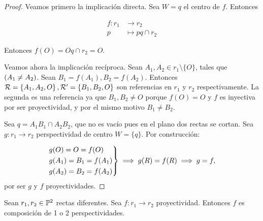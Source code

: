 \begin{proof}
    Veamos primero la implicación directa. Sea $W = {q}$
    el centro de $f$. Entonces

    \begin{align*}
    f : r_1 &\to r_2 \\
    p &\mapsto pq \cap r_2
    \end{align*}
    
    Entonces $f(O) = Oq \cap r_2 = O$.
    
    Veamos ahora la implicación recíproca. Sean $A_1, A_2 \in r_1
    \setminus \{O\}$, tales que $\left( A_1 \neq A_2\right)$. 
    Sean $B_1 = f(A_1), B_2 = f(A_2)$. Entonces $\mathcal{R} = \left \{ A_1, 
    A_2, O \right \}, \mathcal{R}' = \left \{ B_1, B_2, O \right \}$ son
    referencias en $r_1$ y $r_2$ respectivamente. La segunda 
    es una referencia ya que $B_1, B_2 \neq O$ porque $f(O) = O$ y
    $f$ es inyectiva por ser proyectividad, y por el mismo motivo
    $B_1 \neq B_2$.
    
    Sea $q = A_1B_1 \cap A_2B_2$, que no es vacío pues en el
    plano dos rectas se cortan. Sea $g \colon r_1 \to r_2$ 
    perspectividad de centro $W = \{ q\}$. Por construcción:
    
    \[
    \begin{rcases}
        g(O) = O = f(O) \\
        g(A_1) = B_1 = f(A_1) \\
        g(A_2) = B_2 = f(A_2)
    \end{rcases}
    \implies
    g(R) = f(R) \implies g = f,
    \]
    por ser $g$ y $f$ proyectividades.
\end{proof}
\begin{teo*}
    \label{primer_teo_poncelet}
    Sean $r_1, r_2 \in \mathbb{P}^2$ rectas diferentes. Sea $f \colon 
    r_1 \to r_2$ proyectividad. Entonces $f$ es composición
    de 1 o 2 perspectividades.
\end{teo*}
